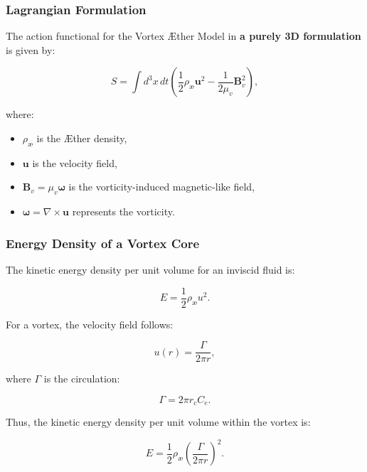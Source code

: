 \subsubsection*{Lagrangian Formulation}
The action functional for the Vortex Æther Model in \textbf{a purely 3D formulation} is given by:

\begin{equation*}
    S = \int d^3x \, dt \left( \frac{1}{2} \rho_\text{\ae} \mathbf{u}^2 - \frac{1}{2 \mu_v} \mathbf{B}_v^2 \right),
\end{equation*}

where:
\begin{itemize}
    \item \( \rho_\text{\ae} \) is the Æther density,
    \item \( \mathbf{u} \) is the velocity field,
    \item \( \mathbf{B}_v = \mu_v \boldsymbol{\omega} \) is the vorticity-induced magnetic-like field,
    \item \( \boldsymbol{\omega} = \nabla \times \mathbf{u} \) represents the vorticity.
\end{itemize}

\subsubsection*{Energy Density of a Vortex Core}
The kinetic energy density per unit volume for an inviscid fluid is:

\begin{equation*}
    E = \frac{1}{2} \rho_\text{\ae} u^2.
\end{equation*}

For a vortex, the velocity field follows:

\begin{equation*}
    u(r) = \frac{\Gamma}{2\pi r},
\end{equation*}

where \( \Gamma \) is the circulation:

\begin{equation*}
    \Gamma = 2\pi r_c C_e.
\end{equation*}

Thus, the kinetic energy density per unit volume within the vortex is:

\begin{equation*}
    E = \frac{1}{2} \rho_\text{\ae} \left( \frac{\Gamma}{2\pi r} \right)^2.
\end{equation*}

